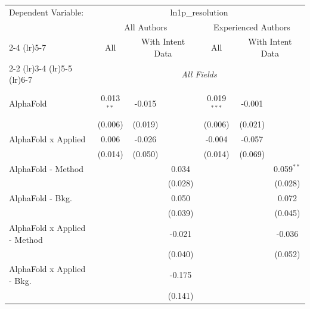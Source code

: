 \begingroup
\centering
\begin{tabular}{lcccccc}
   \tabularnewline \midrule \midrule
   Dependent Variable: & \multicolumn{6}{c}{ln1p\_resolution}\\
 & \multicolumn{3}{c}{All Authors} & \multicolumn{3}{c}{Experienced Authors} \\
\cmidrule(lr){2-4} \cmidrule(lr){5-7}
 & \multicolumn{1}{c}{All} & \multicolumn{2}{c}{With Intent Data} & \multicolumn{1}{c}{All} & \multicolumn{2}{c}{With Intent Data} \\
\cmidrule(lr){2-2} \cmidrule(lr){3-4} \cmidrule(lr){5-5} \cmidrule(lr){6-7}
 & \multicolumn{6}{c}{\textit{All Fields}} \\ \\
   AlphaFold                      & 0.013$^{**}$ & -0.015  &              & 0.019$^{***}$ & -0.001      &   \\   
                                  & (0.006)      & (0.019) &              & (0.006)       & (0.021)     &   \\   
   AlphaFold x Applied            & 0.006        & -0.026  &              & -0.004        & -0.057      &   \\   
                                  & (0.014)      & (0.050) &              & (0.014)       & (0.069)     &   \\   
   AlphaFold - Method             &              &         & 0.034        &               &             & 0.059$^{**}$\\   
                                  &              &         & (0.028)      &               &             & (0.028)\\   
   AlphaFold - Bkg.               &              &         & 0.050        &               &             & 0.072\\   
                                  &              &         & (0.039)      &               &             & (0.045)\\   
   AlphaFold x Applied - Method   &              &         & -0.021       &               &             & -0.036\\   
                                  &              &         & (0.040)      &               &             & (0.052)\\   
   AlphaFold x Applied - Bkg.     &              &         & -0.175       &               &             &   \\   
                                  &              &         & (0.141)      &               &             &   \\   

\end{tabular}
